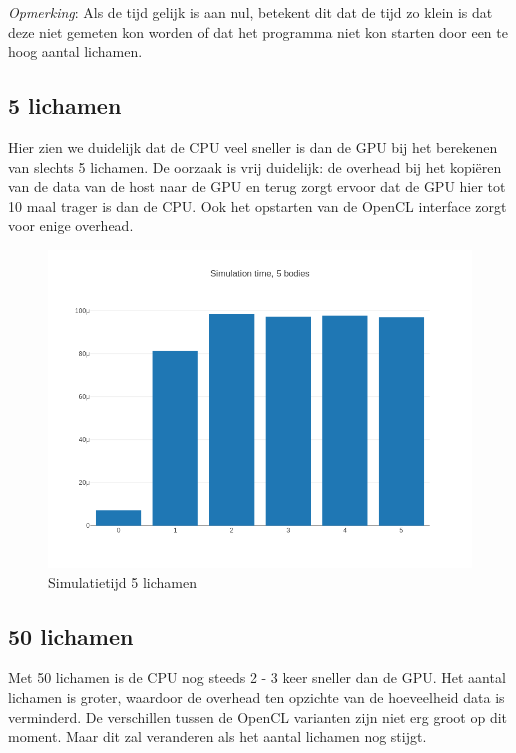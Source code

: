 \documentclass{article}
\begin{document}
\textit{Opmerking}: Als de tijd gelijk is aan nul, betekent dit dat de tijd zo klein is
dat deze niet gemeten kon worden of dat het programma niet kon starten door een te
hoog aantal lichamen.

\subsection{5 lichamen}

Hier zien we duidelijk dat de CPU veel sneller is dan de GPU bij het berekenen van
slechts 5 lichamen. De oorzaak is vrij duidelijk: de overhead bij het kopi\"{e}ren van
de data van de host naar de GPU en terug zorgt ervoor dat de GPU hier tot 10 maal
trager is dan de CPU. Ook het opstarten van de OpenCL interface zorgt voor enige
overhead.
\begin{figure}[H]
    \includegraphics[width=\linewidth]{./grafiekskes/hist_simulation5.png}
    \caption{Simulatietijd 5 lichamen}
\end{figure}
\subsection{50 lichamen}
Met 50 lichamen is de CPU nog steeds 2 - 3 keer sneller dan de GPU. Het aantal
lichamen is groter, waardoor de overhead ten opzichte van de hoeveelheid data
is verminderd. De verschillen tussen de OpenCL varianten zijn niet erg groot op
dit moment. Maar dit zal veranderen als het aantal lichamen nog stijgt.
\end{document}
